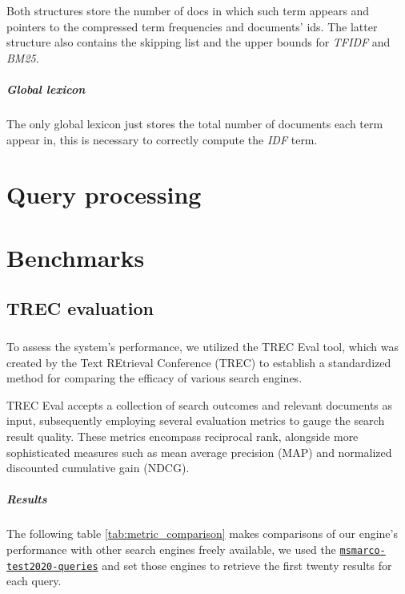 \documentclass[parskip=full]{report}
\begin{document}
Both structures store the number of docs in which such term appears and pointers to the compressed term frequencies and documents' ids. The latter structure also contains the skipping list and the upper bounds for \textit{TFIDF} and \textit{BM25}.

\paragraph{Global lexicon}
The only global lexicon just stores the total number of documents each term appear in, this is necessary to correctly compute the \textit{IDF} term.


\chapter{Query processing}

\chapter{Benchmarks}


\section{TREC evaluation}

\paragraph{}
To assess the system's performance, we utilized the TREC Eval tool, which was created by the Text REtrieval Conference (TREC) to establish a standardized method for comparing the efficacy of various search engines.

TREC Eval accepts a collection of search outcomes and relevant documents as input, subsequently employing several evaluation metrics to gauge the search result quality. These metrics encompass reciprocal rank, alongside more sophisticated measures such as mean average precision (MAP) and normalized discounted cumulative gain (NDCG).

\paragraph{Results}
The following table \ref{tab:metric_comparison} makes comparisons of our engine's performance with other search engines freely available, we used the  \href{https://msmarco.blob.core.windows.net/msmarcoranking/msmarco-test2020-queries.tsv.gz}{\texttt{msmarco-test2020-queries}} and set those engines to retrieve the first twenty results for each query.
\end{document}
